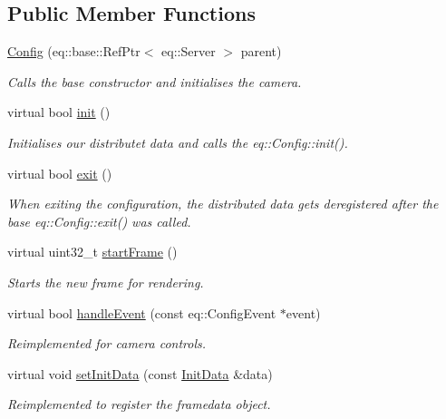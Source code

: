 \subsection*{Public Member Functions}
\begin{CompactItemize}
\item 
\hyperlink{a00003_64865580c67831fd92e8c5222f0554cc}{Config} (eq::base::RefPtr$<$ eq::Server $>$ parent)
\begin{CompactList}\small\item\em Calls the base constructor and initialises the camera. \item\end{CompactList}\item 
virtual bool \hyperlink{a00003_73ab12bbf273fd4ff7e2dea65ee3e6f8}{init} ()
\begin{CompactList}\small\item\em Initialises our distributet data and calls the eq::Config::init(). \item\end{CompactList}\item 
virtual bool \hyperlink{a00003_e656952f262b9e5c3354583a04068b97}{exit} ()
\begin{CompactList}\small\item\em When exiting the configuration, the distributed data gets deregistered after the base eq::Config::exit() was called. \item\end{CompactList}\item 
virtual uint32\_\-t \hyperlink{a00003_955b3c5ffe177012da10434fbc8da7e0}{startFrame} ()
\begin{CompactList}\small\item\em Starts the new frame for rendering. \item\end{CompactList}\item 
virtual bool \hyperlink{a00003_0ac41bd28010ff7f7638beb051b6c9b9}{handleEvent} (const eq::ConfigEvent $\ast$event)
\begin{CompactList}\small\item\em Reimplemented for camera controls. \item\end{CompactList}\item 
virtual void \hyperlink{a00003_eac7f3b423d994667bac2007c5d78cc1}{setInitData} (const \hyperlink{a00011}{InitData} \&data)
\begin{CompactList}\small\item\em Reimplemented to register the framedata object. \item\end{CompactList}\item 

\end{CompactItemize}
